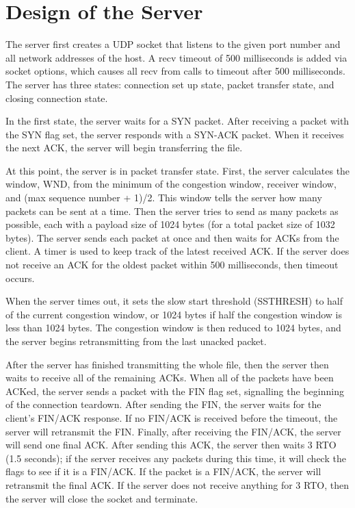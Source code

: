\documentclass{article}
\begin{document}
\section{Design of the Server}
    The server first creates a UDP socket that listens to the given port number
    and all network addresses of the host. A recv timeout of 500 milliseconds
    is added via socket options, which causes all recv from calls to timeout
    after 500 milliseconds. The server has three states: connection set up
    state, packet transfer state, and closing connection state.

    In the first state, the server waits for a SYN packet. After receiving a
    packet with the SYN flag set, the server responds with a SYN-ACK packet.
    When it receives the next ACK, the server will begin transferring the file.

    At this point, the server is in packet transfer state. First, the server
    calculates the window, WND, from the minimum of the congestion window,
    receiver window, and (max sequence number + 1)/2. This window tells the
    server how many packets can be sent at a time. Then the server tries to
    send as many packets as possible, each with a payload size of 1024 bytes
    (for a total packet size of 1032 bytes). The server sends each packet at
    once and then waits for ACKs from the client. A timer is used to keep track
    of the latest received ACK. If the server does not receive an ACK for the
    oldest packet within 500 milliseconds, then timeout occurs.

    When the server times out, it sets the slow start threshold (SSTHRESH) to
    half of the current congestion window, or 1024 bytes if half the congestion
    window is less than 1024 bytes. The congestion window is then reduced to
    1024 bytes, and the server begins retransmitting from the last unacked
    packet.

    After the server has finished transmitting the whole file, then the server
    then waits to receive all of the remaining ACKs. When all of the packets
    have been ACKed, the server sends a packet with the FIN flag set,
    signalling the beginning of the connection teardown. After sending the FIN,
    the server waits for the client's FIN/ACK response. If no FIN/ACK is
    received before the timeout, the server will retransmit the FIN. Finally,
    after receiving the FIN/ACK, the server will send one final ACK. After
    sending this ACK, the server then waits 3 RTO (1.5 seconds); if the server
    receives any packets during this time, it will check the flags to see if it
    is a FIN/ACK. If the packet is a FIN/ACK, the server will retransmit the
    final ACK. If the server does not receive anything for 3 RTO, then the
    server will close the socket and terminate.
\end{document}
